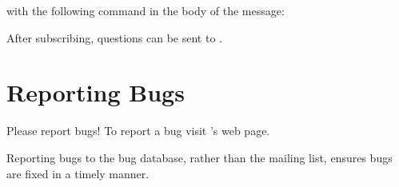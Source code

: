 
with the following command in the body of the message:


After subscribing, questions can be sent to
.

\section{Reporting Bugs}
\label{sec:bugs}

Please report bugs!  To report a bug visit \sr{}'s
 web page.

Reporting bugs to the bug database, rather than the mailing list,  ensures
bugs are fixed in a timely manner.

